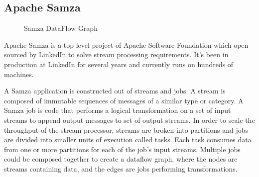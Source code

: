 \subsection{Apache Samza}
\begin{figure}
  \begin{center}
   \caption{Samza DataFlow Graph}
   \label{fig:smaza_dataflow}
  \end{center}
\end{figure}

Apache Samza is a top-level project of Apache Software Foundation which open sourced by LinkedIn to solve stream processing requirements. It's been in production at LinkedIn for several years and currently runs on hundreds of machines. 

A Samza application is constructed out of streams and jobs. A stream is composed of immutable sequences of messages of a similar type or category.  A Samza job is code that performs a logical transformation on a set of input streams to append output messages to set of output streams. In order to scale the throughput of the stream processor, streams are broken into partitions and jobs are divided into smaller units of execution called tasks. Each task consumes data from one or more partitions for each of the job's input streams. Multiple jobs could be composed together to create a dataflow graph, where the nodes are streams containing data, and the edges are jobs performing transformations. 


